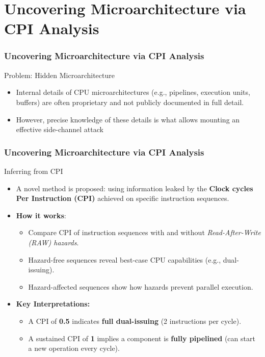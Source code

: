 
\section{Uncovering Microarchitecture via CPI Analysis}




\begin{frame}
    \frametitle{Uncovering Microarchitecture via CPI Analysis}
    \begin{block}{Problem: Hidden Microarchitecture}
        \begin{itemize}
            \item Internal details of CPU microarchitectures (e.g., pipelines, execution units, buffers) are often proprietary and not publicly documented in full detail.
            \item However, precise knowledge of these details is what allows mounting an effective side-channel attack
        \end{itemize}
    \end{block}
\end{frame}

\begin{frame}
    \frametitle{Uncovering Microarchitecture via CPI Analysis}
    \begin{block}{Inferring from CPI}
        \begin{itemize}
            \item A novel method is proposed: using information leaked by the \textbf{Clock cycles Per Instruction (CPI)} achieved on specific instruction sequences.
            \item \textbf{How it works}:
                \begin{itemize}
                    \item Compare CPI of instruction sequences with and without \textit{Read-After-Write (RAW) hazards}.
                    \item Hazard-free sequences reveal best-case CPU capabilities (e.g., dual-issuing).
                    \item Hazard-affected sequences show how hazards prevent parallel execution.
                \end{itemize}
            \item \textbf{Key Interpretations:}
                \begin{itemize}
                    \item A CPI of \textbf{0.5} indicates \textbf{full dual-issuing} (2 instructions per cycle).
                    \item A sustained CPI of \textbf{1} implies a component is \textbf{fully pipelined} (can start a new operation every cycle).
                \end{itemize}
        \end{itemize}
    \end{block}
\end{frame}

